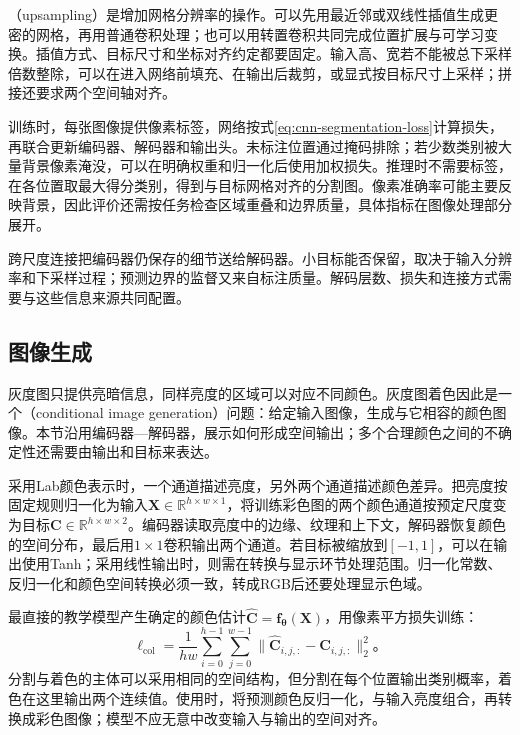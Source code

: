 （upsampling）是增加网格分辨率的操作。可以先用最近邻或双线性插值生成更密的网格，再用普通卷积处理；也可以用转置卷积共同完成位置扩展与可学习变换。插值方式、目标尺寸和坐标对齐约定都要固定。输入高、宽若不能被总下采样倍数整除，可以在进入网络前填充、在输出后裁剪，或显式按目标尺寸上采样；拼接还要求两个空间轴对齐。

训练时，每张图像提供像素标签，网络按式\eqref{eq:cnn-segmentation-loss}计算损失，再联合更新编码器、解码器和输出头。未标注位置通过掩码排除；若少数类别被大量背景像素淹没，可以在明确权重和归一化后使用加权损失。推理时不需要标签，在各位置取最大得分类别，得到与目标网格对齐的分割图。像素准确率可能主要反映背景，因此评价还需按任务检查区域重叠和边界质量，具体指标在图像处理部分展开。

跨尺度连接把编码器仍保存的细节送给解码器。小目标能否保留，取决于输入分辨率和下采样过程；预测边界的监督又来自标注质量。解码层数、损失和连接方式需要与这些信息来源共同配置。

\FloatBarrier

\subsection{图像生成}
\label{sec:cnn-colorization}

灰度图只提供亮暗信息，同样亮度的区域可以对应不同颜色。灰度图着色因此是一个（conditional image generation）问题：给定输入图像，生成与它相容的颜色图像。本节沿用编码器—解码器，展示如何形成空间输出；多个合理颜色之间的不确定性还需要由输出和目标来表达。

采用Lab颜色表示时，一个通道描述亮度，另外两个通道描述颜色差异。把亮度按固定规则归一化为输入$\bm X\in\mathbb R^{h\times w\times1}$，将训练彩色图的两个颜色通道按预定尺度变为目标$\bm C\in\mathbb R^{h\times w\times2}$。编码器读取亮度中的边缘、纹理和上下文，解码器恢复颜色的空间分布，最后用$1\times1$卷积输出两个通道。若目标被缩放到$[-1,1]$，可以在输出使用Tanh；采用线性输出时，则需在转换与显示环节处理范围。归一化常数、反归一化和颜色空间转换必须一致，转成RGB后还要处理显示色域。

最直接的教学模型产生确定的颜色估计$\widehat{\bm C}=\bm f_{\bm\theta}(\bm X)$，用像素平方损失训练：
\begin{equation}
  \ell_{\mathrm{col}}=\frac1{hw}\sum_{i=0}^{h-1}\sum_{j=0}^{w-1}
      \lVert\widehat{\bm C}_{i,j,:}-\bm C_{i,j,:}\rVert_2^2\text{。}
  \label{eq:cnn-colorization-loss}
\end{equation}
分割与着色的主体可以采用相同的空间结构，但分割在每个位置输出类别概率，着色在这里输出两个连续值。使用时，将预测颜色反归一化，与输入亮度组合，再转换成彩色图像；模型不应无意中改变输入与输出的空间对齐。

